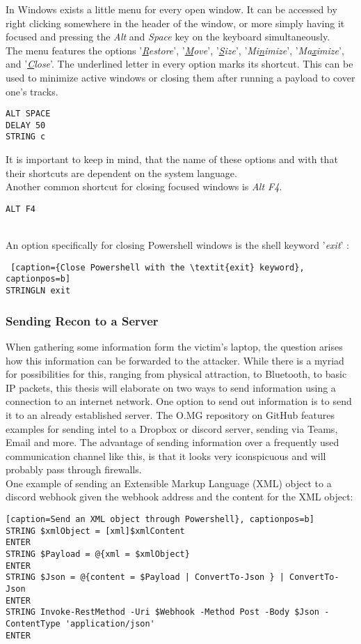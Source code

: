 In Windows exists a little menu for every open window. It can be accessed by right clicking somewhere in the header of the window, or more simply having it focused and pressing the \textit{Alt} and \textit{Space} key on the keyboard simultaneously. \\
The menu features the options '\textit{\underline{R}estore}', '\textit{\underline{M}ove}', '\textit{\underline{S}ize}', '\textit{Mi\underline{n}imize}', '\textit{Ma\underline{x}imize}', and '\textit{\underline{C}lose}'. The underlined letter in every option marks its shortcut. This can be used to minimize active windows or closing them after running a payload to cover one's tracks.
\begin{lstlisting}[caption={Close a window through its window menu}, captionpos=b]
ALT SPACE
DELAY 50
STRING c
\end{lstlisting}
It is important to keep in mind, that the name of these options and with that their shortcuts are dependent on the system language. \\
Another common shortcut for closing focused windows is \textit{Alt F4}.
\begin{lstlisting}[caption={Close a window with ALT F4}, captionpos=b]
ALT F4
\end{lstlisting}
\\

An option specifically for closing Powershell windows is the shell keyword '\textit{exit}' :
\begin{lstlisting} [caption={Close Powershell with the \textit{exit} keyword}, captionpos=b]
STRINGLN exit
\end{lstlisting}


\subsubsection{Sending Recon to a Server}

When gathering some information form the victim's laptop, the question arises how this information can be forwarded to the attacker. While there is a myriad for possibilities for this, ranging from physical attraction, to Bluetooth, to basic IP packets, this thesis will elaborate on two ways to send information using a connection to an internet network.
One option to send out information is to send it to an already established server. The O.MG repository on GitHub features examples for sending intel to a Dropbox or discord server, sending via Teams, Email and more. The advantage of sending information over a frequently used communication channel like this, is that it looks very iconspicuous and will probably pass through firewalls.\\
One example of sending an Extensible Markup Language (XML) object to a discord webhook given the webhook address and the content for the XML object:
\begin{lstlisting}[caption=Send an XML object through Powershell}, captionpos=b]
STRING $xmlObject = [xml]$xmlContent
ENTER
STRING $Payload = @{xml = $xmlObject}
ENTER
STRING $Json = @{content = $Payload | ConvertTo-Json } | ConvertTo-Json	
ENTER
STRING Invoke-RestMethod -Uri $Webhook -Method Post -Body $Json -ContentType 'application/json'
ENTER
\end{lstlisting}


